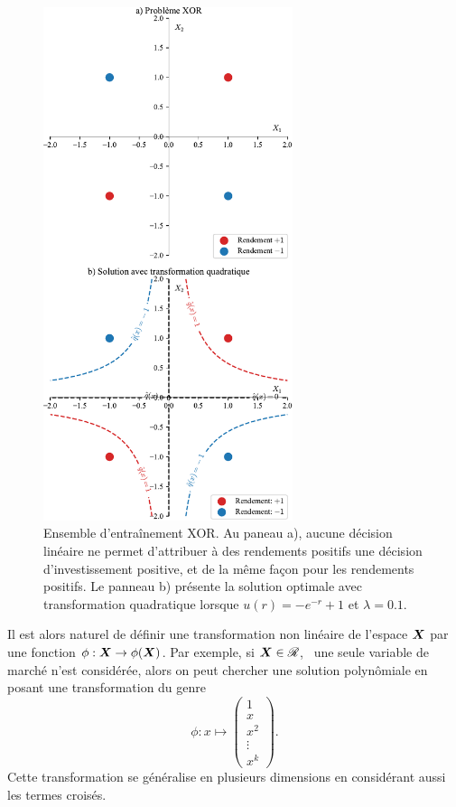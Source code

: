 \begin{figure}[p]
  \centering
  \includegraphics[width=0.65\textwidth]{../experiments/fig/pres/pres5_fr.pdf}
  \caption[Problème XOR]{Ensemble d'entraînement XOR. Au paneau a), aucune décision
    linéaire ne permet d'attribuer à des rendements positifs une décision d'investissement
    positive, et de la même façon pour les rendements positifs. Le panneau b) présente la
    solution optimale avec transformation quadratique lorsque $u(r)=-e^{-r}+1$ et
    $\lambda=0.1$.}
  \label{fig_xor}
\end{figure}


Il est alors naturel de définir une transformation non linéaire de l'espace $\bm{X}$ par une
fonction $\phi:\bm{X}\to\phi(\bm{X})$. Par exemple, si $\bm{X} \in \mathscr{R}$, \ie\ une seule variable de marché n'est
considérée, alors on peut chercher une solution polynômiale en posant une transformation
du genre
\begin{equation}
  \phi:x \mapsto
  \begin{pmatrix}
    1 \\ x \\ x^2 \\ \vdots \\ x^k
  \end{pmatrix}.
\end{equation}
Cette transformation se généralise en plusieurs dimensions en considérant aussi les termes
croisés.

